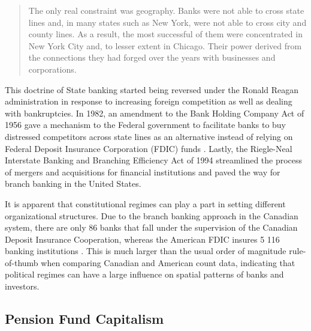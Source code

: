 
\begin{quote}

The only real constraint was geography. Banks were not able to cross state lines and, in many states such as New York, were not able to cross city and county lines. As a result, the most successful of them were concentrated in New York City and, to lesser extent in Chicago. Their power derived from the connections they had forged over the years with businesses and corporations.\citep[p.120]{geisst1997wall}
\end{quote}


This doctrine of State banking started being reversed under the Ronald Reagan administration in response to increasing foreign competition as well as dealing with bankruptcies.  In 1982, an amendment to the Bank Holding Company Act of 1956 gave a mechanism to the Federal government to facilitate banks to buy distressed competitors across state lines as an alternative instead of relying on Federal Deposit Insurance Corporation (FDIC) funds \citep{Calomiris2000,CalomirisHaber14}.  Lastly, the Riegle-Neal Interstate Banking and Branching Efficiency Act of 1994 streamlined the process of mergers and acquisitions for financial institutions and paved the way for branch banking in the United States.

It is apparent that constitutional regimes can play a part in setting different organizational structures.  Due to the branch banking approach in the Canadian system, there are only 86 banks that fall under the supervision of the Canadian Deposit Insurance Cooperation, whereas the American FDIC insures 5 116 banking institutions \citep{CanadianDepositInsuranceCooperation2020,FDIC2020}.  This is much larger than the usual order of magnitude rule-of-thumb when comparing Canadian and American count data, indicating that political regimes can have a large influence on spatial patterns of banks and investors. 

\subsection{Pension Fund Capitalism} 

